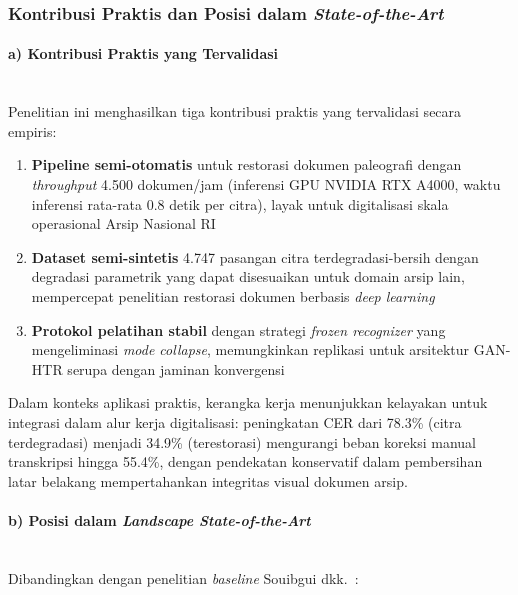 \documentclass[12pt,a4paper]{article}
\begin{document}
\vspace{0.8em}

\subsubsection{Kontribusi Praktis dan Posisi dalam \textit{State-of-the-Art}}
\label{subsubsec:posisi-penelitian}

\paragraph{a) Kontribusi Praktis yang Tervalidasi}\mbox{}\\[0.1em]

Penelitian ini menghasilkan tiga kontribusi praktis yang tervalidasi secara empiris:

\begin{enumerate}[nosep]
    \item \textbf{Pipeline semi-otomatis} untuk restorasi dokumen paleografi dengan \textit{throughput} 4.500 dokumen/jam (inferensi GPU NVIDIA RTX A4000, waktu inferensi rata-rata 0.8 detik per citra), layak untuk digitalisasi skala operasional Arsip Nasional RI
    \item \textbf{Dataset semi-sintetis} 4.747 pasangan citra terdegradasi-bersih dengan degradasi parametrik yang dapat disesuaikan untuk domain arsip lain, mempercepat penelitian restorasi dokumen berbasis \textit{deep learning}
    \item \textbf{Protokol pelatihan stabil} dengan strategi \textit{frozen recognizer} yang mengeliminasi \textit{mode collapse}, memungkinkan replikasi untuk arsitektur GAN-HTR serupa dengan jaminan konvergensi
\end{enumerate}

Dalam konteks aplikasi praktis, kerangka kerja menunjukkan kelayakan untuk integrasi dalam alur kerja digitalisasi: peningkatan CER dari 78.3\% (citra terdegradasi) menjadi 34.9\% (terestorasi) mengurangi beban koreksi manual transkripsi hingga 55.4\%, dengan pendekatan konservatif dalam pembersihan latar belakang mempertahankan integritas visual dokumen arsip.

\paragraph{b) Posisi dalam \textit{Landscape State-of-the-Art}}\mbox{}\\[0.1em]

Dibandingkan dengan penelitian \textit{baseline} Souibgui dkk.~\cite{souibgui2022docentr,souibgui2021enhance}:
\end{document}

